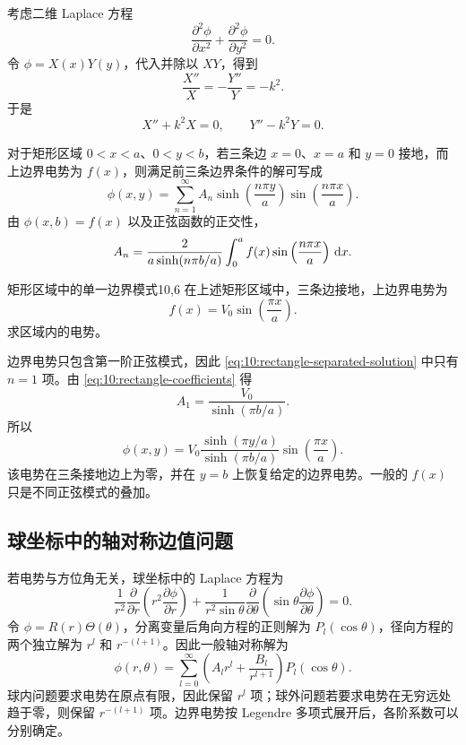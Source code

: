 考虑二维 Laplace 方程
\[
\frac{\partial^{2}\phi}{\partial x^{2}}
+
\frac{\partial^{2}\phi}{\partial y^{2}}
=0.
\]
令 $\phi=X(x)Y(y)$，代入并除以 $XY$，得到
\[
\frac{X''}{X}
=
-\frac{Y''}{Y}
=
-k^{2}.
\]
于是
\[
X''+k^{2}X=0,
\qquad
Y''-k^{2}Y=0.
\]

对于矩形区域 $0<x<a$、$0<y<b$，若三条边
$x=0$、$x=a$ 和 $y=0$ 接地，而上边界电势为 $f(x)$，则满足前三条边界条件的解可写成
\begin{equation}
	\phi(x,y)
	=
	\sum_{n=1}^{\infty}
	A_{n}
	\sinh\left(\frac{n\pi y}{a}\right)
	\sin\left(\frac{n\pi x}{a}\right).
	\label{eq:10:rectangle-separated-solution}
\end{equation}
由 $\phi(x,b)=f(x)$ 以及正弦函数的正交性，
\begin{equation}
	A_{n}
	=
	\frac{2}
	{a\sinh(n\pi b/a)}
	\int_{0}^{a}
	f(x)
	\sin\left(\frac{n\pi x}{a}\right)
	\,\mathop{}\!\mathrm{d} x.
	\label{eq:10:rectangle-coefficients}
\end{equation}

\begin{example}{矩形区域中的单一边界模式}{10,6}
在上述矩形区域中，三条边接地，上边界电势为
\[
f(x)=V_{0}\sin\left(\frac{\pi x}{a}\right).
\]
求区域内的电势。

\begin{solution}
边界电势只包含第一阶正弦模式，因此
\eqref{eq:10:rectangle-separated-solution} 中只有 $n=1$ 项。由
\eqref{eq:10:rectangle-coefficients} 得
\[
A_{1}
=
\frac{V_{0}}{\sinh(\pi b/a)}.
\]
所以
\[
\phi(x,y)
=
V_{0}
\frac{\sinh(\pi y/a)}
{\sinh(\pi b/a)}
\sin\left(\frac{\pi x}{a}\right).
\]
该电势在三条接地边上为零，并在 $y=b$ 上恢复给定的边界电势。一般的
$f(x)$ 只是不同正弦模式的叠加。
\end{solution}
\end{example}

\subsection{球坐标中的轴对称边值问题}

若电势与方位角无关，球坐标中的 Laplace 方程为
\[
\frac{1}{r^{2}}
\frac{\partial}{\partial r}
\left(
r^{2}\frac{\partial\phi}{\partial r}
\right)
+
\frac{1}{r^{2}\sin\theta}
\frac{\partial}{\partial\theta}
\left(
\sin\theta\frac{\partial\phi}{\partial\theta}
\right)
=0.
\]
令 $\phi=R(r)\Theta(\theta)$，分离变量后角向方程的正则解为
$P_{l}(\cos\theta)$，径向方程的两个独立解为 $r^{l}$ 和
$r^{-(l+1)}$。因此一般轴对称解为
\begin{equation}
	\phi(r,\theta)
	=
	\sum_{l=0}^{\infty}
	\left(
	A_{l}r^{l}
	+
	\frac{B_{l}}{r^{l+1}}
	\right)
	P_{l}(\cos\theta).
	\label{eq:10:spherical-separated-solution}
\end{equation}
球内问题要求电势在原点有限，因此保留 $r^{l}$ 项；球外问题若要求电势在无穷远处趋于零，则保留 $r^{-(l+1)}$ 项。边界电势按 Legendre 多项式展开后，各阶系数可以分别确定。

